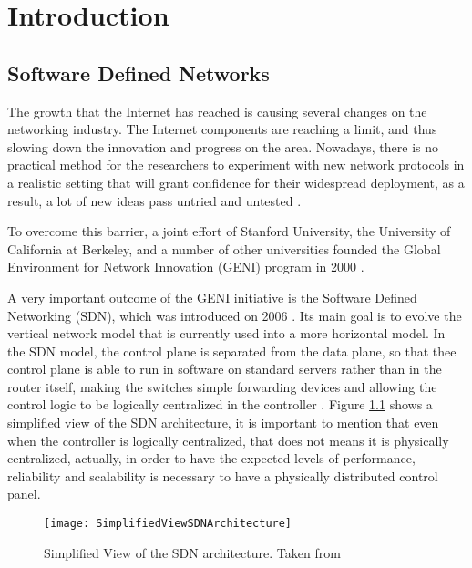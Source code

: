 
\chapter{Introduction}
%

\section{Software Defined Networks}
%

The growth that the Internet has reached is causing several changes on the networking industry. The Internet components are reaching a limit, and thus slowing down the innovation and progress on the area. Nowadays, there is no practical method for the researchers to experiment with new network protocols in a realistic setting that will grant confidence for their widespread deployment, as a result, a lot of new ideas pass untried and untested \cite{mckeown2008openflow}.

To overcome this barrier, a joint effort of Stanford University, the University of California at Berkeley, and a number of other universities founded the Global Environment for Network Innovation (GENI) program in 2000 \cite{li2013software}.

A very important outcome of the GENI initiative is the Software Defined Networking (SDN), which was introduced on 2006 \cite{casado2006sane}. Its main goal is to evolve the vertical network model that is currently used into a more horizontal model. In the SDN model, the control plane is separated from the data plane, so that thee control plane is able to run in software on standard servers rather than in the router itself, making the switches simple forwarding devices and allowing the control logic to be logically centralized in the controller \cite{kreutz2015software}. Figure \ref{f:SDN_arch} shows a simplified view of the SDN architecture, it is important to mention that even when the controller is logically centralized, that does not means it is physically centralized, actually, in order to have the expected levels of performance, reliability and scalability is necessary to have a physically distributed control panel.


\begin{figure}[htb] %
	\begin{center}
 		\texttt{[image: SimplifiedViewSDNArchitecture]}
		\caption[Simplified View of the SDN architecture.]{Simplified View of the SDN architecture. Taken from \cite{kreutz2015software}}
		\label{f:SDN_arch}
	\end{center}
\end{figure}


